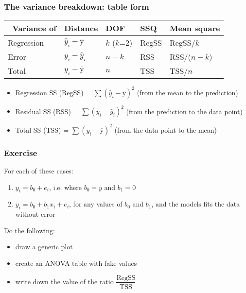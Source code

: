 \begin{frame}\frametitle{The variance breakdown: table form}
	
	\newpage 
	\begin{table}
		[ht] \centering 
		\begin{tabular}
			{lllll} \hline\ \textbf{Variance of} & \textbf{Distance} &\textbf{DOF} &\textbf{SSQ} &\textbf{Mean square} \\
			\hline Regression & $\hat{y}_i - \overline{\mathrm{y}}$ & $k$ ($k$=2) & RegSS & RegSS/$k$ \\
			Error & $y_i - \hat{y}_i$ & $n-k$ & RSS & RSS/($n-k$) \\
			\hline \hline Total & $y_i - \overline{\mathrm{y}}$ & $n$ & TSS & TSS/$n$ \\
			\hline 
		\end{tabular}
	\end{table}
	\begin{itemize}
		\item	Regression SS (RegSS) = $\sum{(\hat{y}_i - \overline{\mathrm{y}})^2}$ (from the mean to the prediction) 
		\item	Residual SS (RSS) = $\sum{(y_i - \hat{y}_i)^2}$ (from the prediction to the data point) 
		\item	Total SS (TSS) = $\sum{(y_i - \overline{\mathrm{y}})^2}$ (from the data point to the mean) 
	\end{itemize}
\end{frame}

\begin{frame}\frametitle{Exercise}
	
	For each of these cases:
	\begin{enumerate}
		\item	$y_i = b_0 + e_i$, i.e. where $b_0 = \overline{y}$ and $b_1 = 0$ 
		\item	$y_i = b_0 + b_1 x_i + e_i$, for any values of $b_0$ and $b_1$, and the models fits the data without error 
	\end{enumerate}
	
	Do the following:
	\begin{itemize}
		\item	draw a generic plot 
		\item	create an ANOVA table with fake values 
		\item	write down the value of the ratio $\dfrac{\text{RegSS}}{\text{TSS}}$ 
	\end{itemize}
\end{frame}

